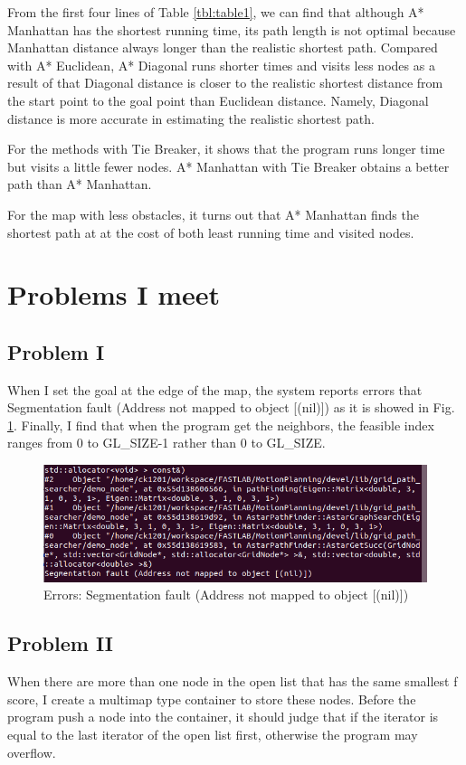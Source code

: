 \documentclass[conference]{IEEEtran}
\begin{document}
From the first four lines of Table \ref {tbl:table1}, we can find that although A* Manhattan has the shortest running time, its path length is not optimal because Manhattan distance always longer than the realistic shortest path. Compared with A* Euclidean, A* Diagonal runs shorter times and visits less nodes as a result of that Diagonal distance is closer to the realistic shortest distance from the start point to the goal point than Euclidean distance. Namely, Diagonal distance is more accurate in estimating the realistic shortest path.

For the methods with Tie Breaker, it shows that the program runs longer time but visits a little fewer nodes. A* Manhattan with Tie Breaker obtains a better path than A* Manhattan.

For the map with less obstacles, it turns out that A* Manhattan finds the shortest path at at the cost of both least running time and visited nodes.


\section{Problems I meet}
\subsection{Problem I}
When I set the goal at the edge of the map, the system reports errors that Segmentation fault (Address not mapped to object [(nil)]) as it is showed in Fig. \ref{fig:label5_1}. Finally, I find that when the program get the neighbors, the feasible index ranges from 0 to GL\_SIZE-1 rather than 0 to GL\_SIZE.

\begin{figure}[htbp]
	\centering
	\includegraphics[scale=0.3]{figs/fig5_1.png}
	\caption{Errors: Segmentation fault (Address not mapped to object [(nil)])}
	\label{fig:label5_1}
\end{figure}


\subsection{Problem II}
When there are more than one node in the open list that has the same smallest f score, I create a multimap type container to store these nodes. Before the program push a node into the container, it should judge that if the iterator is equal to the last iterator of the open list first,  otherwise the program may overflow.
\end{document}
